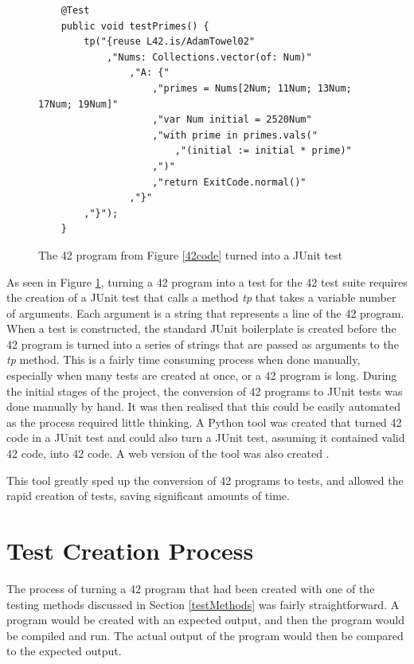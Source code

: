 \begin{figure}[h]		

\begin{lstlisting}
	@Test
	public void testPrimes() {
		tp("{reuse L42.is/AdamTowel02"
			,"Nums: Collections.vector(of: Num)"
				,"A: {"
			    	,"primes = Nums[2Num; 11Num; 13Num; 17Num; 19Num]"
			    	,"var Num initial = 2520Num"
					,"with prime in primes.vals("
						,"(initial := initial * prime)"
					,")"
			    	,"return ExitCode.normal()"
				,"}"
		,"}");
	}		

\end{lstlisting} 
\caption{The 42 program from Figure \ref{42code} turned into a JUnit test \label{javacode}}
\end{figure}

As seen in Figure \ref{javacode}, turning a 42 program into a test for the 42 test suite requires the creation of a JUnit test that calls a method \textit{tp} that takes a variable number of arguments. Each argument is a string that represents a line of the 42 program. When a test is constructed, the standard JUnit boilerplate is created before the 42 program is turned into a series of strings that are passed as arguments to the \textit{tp} method. This is a fairly time consuming process when done manually, especially when many tests are created at once, or a 42 program is long. During the initial stages of the project, the conversion of 42 programs to JUnit tests was done manually by hand. It was then realised that this could be easily automated as the process required little thinking. A Python tool was created \cite{pytest} that turned 42 code in a JUnit test and could also turn a JUnit test, assuming it contained valid 42 code, into 42 code. A web version of the tool was also created \cite{jstest}. 


This tool greatly sped up the conversion of 42 programs to tests, and allowed the rapid creation of tests, saving significant amounts of time. 

\section{Test Creation Process}

The process of turning a 42 program that had been created with one of the testing methods discussed in Section \ref{testMethods} was fairly straightforward. A program would be created with an expected output, and then the program would be compiled and run. The actual output of the program would then be compared to the expected output.

